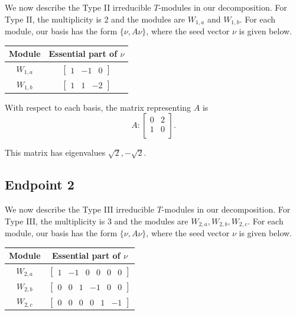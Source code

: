 \documentclass[12pt,letterpaper]{article}
\newcommand{\rowvector}[1]{\begin{bmatrix} #1 \end{bmatrix}}
\begin{document}
We now describe the Type II irreducible $T$-modules in our decomposition. For Type II, the multiplicity is 2 and the modules are $W_{1,a}$ and $W_{1,b}$. For each module, our basis has the form $\{\nu, A\nu\}$, where the seed vector $\nu$ is given below.
\begin{center}
    \begin{tabular}{c | c}
    \toprule
       \textbf{Module}  & \textbf {Essential part of }$\nu$ \\
       \midrule
       $W_{1,a}$  & $\rowvector{1 & -1 & 0}$ \\[1.67pt]
       $W_{1,b}$  & $\rowvector{1 & 1 & -2}$ \\
    \bottomrule
    \end{tabular}
\end{center}

With respect to each basis, the matrix representing $A$ is 
\begin{equation}
    A: \begin{bmatrix}
  0 & 2 \\
  1 & 0 \\
\end{bmatrix}.
\label{eq:hea-II}
\end{equation}

This matrix has eigenvalues $\sqrt{2}, -\sqrt{2}$.

\subsection{Endpoint 2}

We now describe the Type III irreducible $T$-modules in our decomposition. For Type III, the multiplicity is 3 and the modules are $W_{2,a}, W_{2,b}, W_{2,c}$. For each module, our basis has the form $\{\nu, A\nu\}$, where the seed vector $\nu$ is given below.
\begin{center}
    \begin{tabular}{c | c}
    \toprule
       \textbf{Module}  & \textbf {Essential part of }$\nu$ \\
       \midrule
       $W_{2,a}$  & $\rowvector{1 & -1 & 0 & 0 &0&0}$ \\[1.67pt]
       $W_{2,b}$  & $\rowvector{0 & 0 & 1 & -1 &0&0}$ \\[1.67pt]
       $W_{2,c}$  & $\rowvector{0 & 0 & 0 & 0 &1&-1}$ \\
    \bottomrule
    \end{tabular}
\end{center}
\end{document}

